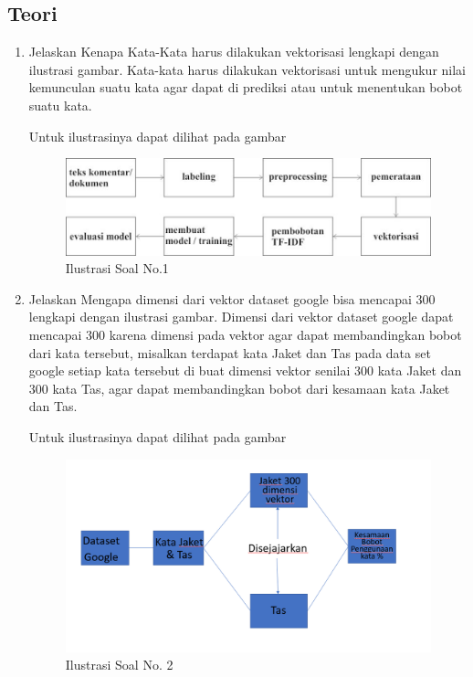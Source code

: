 \subsection{Teori}
\begin{enumerate}
\item Jelaskan Kenapa Kata-Kata harus dilakukan vektorisasi lengkapi dengan ilustrasi gambar.
\subitem Kata-kata harus dilakukan vektorisasi untuk mengukur nilai kemunculan suatu kata agar dapat di prediksi atau untuk menentukan bobot suatu kata.
\par Untuk ilustrasinya dapat dilihat pada gambar
\begin{figure}[ht]
	\centerline{\includegraphics[width=1\textwidth]{figures/andi/L1.PNG}}
	\caption{Ilustrasi Soal No.1}
\end{figure}

\item Jelaskan Mengapa dimensi dari vektor dataset google bisa mencapai 300 lengkapi dengan ilustrasi gambar.
\subitem Dimensi dari vektor dataset google dapat mencapai 300 karena dimensi pada vektor agar dapat membandingkan bobot dari kata tersebut, misalkan terdapat kata Jaket dan Tas pada data set google setiap kata tersebut di buat dimensi vektor senilai 300 kata Jaket dan 300 kata Tas, agar dapat membandingkan bobot dari kesamaan kata Jaket dan Tas. 
\par Untuk ilustrasinya dapat dilihat pada gambar 
\begin{figure}[ht]
	\centerline{\includegraphics[width=1\textwidth]{figures/andi/L2.PNG}}
	\caption{Ilustrasi Soal No. 2}
	

\end{figure}
\end{enumerate}
